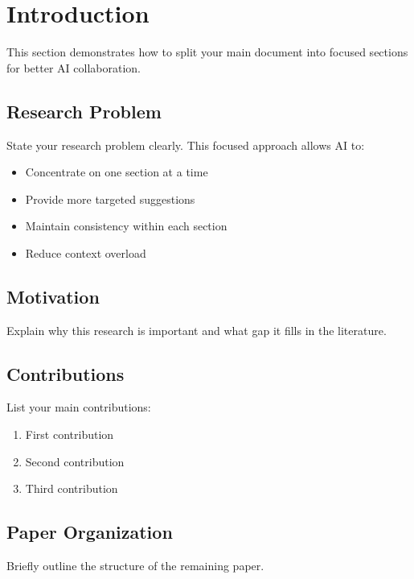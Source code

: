 
\section{Introduction}

This section demonstrates how to split your main document into focused sections for better AI collaboration.

\subsection{Research Problem}
State your research problem clearly. This focused approach allows AI to:
\begin{itemize}
    \item Concentrate on one section at a time
    \item Provide more targeted suggestions
    \item Maintain consistency within each section
    \item Reduce context overload
\end{itemize}

\subsection{Motivation}
Explain why this research is important and what gap it fills in the literature.

\subsection{Contributions}
List your main contributions:
\begin{enumerate}
    \item First contribution
    \item Second contribution 
    \item Third contribution
\end{enumerate}

\subsection{Paper Organization}
Briefly outline the structure of the remaining paper. 